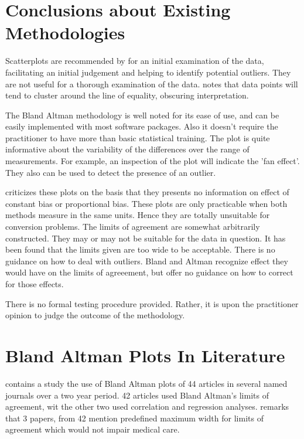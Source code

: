 \documentclass[Main.tex]{subfiles}
\begin{document}
	
	







\newpage
\section{Conclusions about Existing Methodologies}

Scatterplots are recommended by \citet{BA83} for an initial
examination of the data, facilitating an initial judgement and helping to identify potential outliers. They are not useful for a
thorough examination of the data. \citet{BritHypSoc} notes that data points will tend to cluster around the line of equality,
obscuring interpretation.


The Bland Altman methodology is well noted for its ease of use, and can be easily implemented with most software packages. Also it
doesn't require the practitioner to have more than basic statistical training. The plot is quite informative about the
variability of the differences over the range of measurements. For
example, an inspection of the plot will indicate the 'fan effect'.
They also can be used to detect the presence of an outlier.

\citet{ludbrook97,ludbrook02}criticizes these plots on the
basis that they presents no information on effect of constant bias
or proportional bias. These plots are only practicable when both methods measure in the same units. Hence they are totally
unsuitable for conversion problems. The limits of agreement are somewhat arbitrarily constructed. They may or may not be suitable
for the data in question. It has been found that the limits given are too wide to be acceptable. There is no guidance on how to deal
with outliers. Bland and Altman recognize effect they would have on the limits of agreeement, but offer no guidance on how to
correct for those effects.

There is no formal testing procedure provided. Rather, it is upon
the practitioner opinion to judge the outcome of the methodology.











	\section{Bland Altman Plots In Literature}
	\citet{mantha} contains a study the use of Bland Altman plots of
	44 articles in several named journals over a two year period. 42
	articles used Bland Altman's limits of agreement, wit the other
	two used correlation and regression analyses. \citet{mantha}
	remarks that 3 papers, from 42 mention predefined maximum width
	for limits of agreement which would not impair medical care.
	
\end{document}
